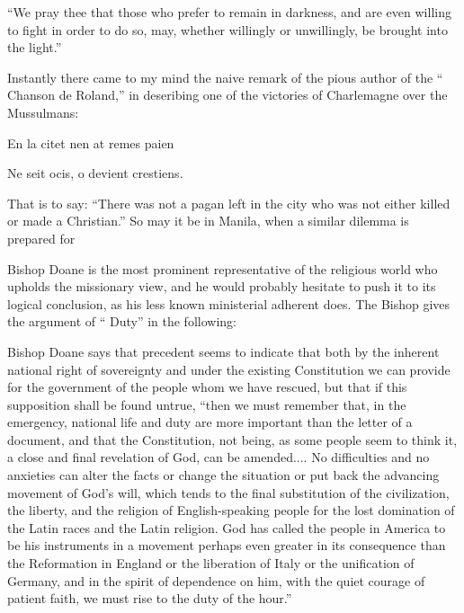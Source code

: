\documentclass[11pt,openany]{book}
\begin{document}
``We pray thee that those who prefer to remain in darkness, and are even willing to fight in order to do so, may, whether willingly or unwillingly, be brought into the light.''

Instantly there came to my mind the naive remark of the pious author of the `` Chanson de Roland,'' in deseribing one of the victories of Charlemagne over the Mussulmans:

En la citet nen at remes paien

Ne seit ocis, o devient crestiens.

That is to say: ``There was not a pagan left in the city who was not either killed or made a Christian.'' So may it be in Manila, when a similar dilemma is prepared for

Bishop Doane is the most prominent representative of the religious world who upholds the missionary view, and he would probably hesitate to push it to its logical conclusion, as his less known ministerial adherent does. The Bishop gives the argument of `` Duty'' in the following:

Bishop Doane says that precedent seems to indicate that both by the inherent national right of sovereignty and under the existing Constitution we can provide for the government of the people whom we have rescued, but that if this supposition shall be found untrue, ``then we must remember that, in the emergency, national life and duty are more important than the letter of a document, and that the Constitution, not being, as some people seem to think it, a close and final revelation of God, can be amended.... No difficulties and no anxieties can alter the facts or change the situation or put back the advancing movement of God's will, which tends to the final substitution of the civilization, the liberty, and the religion of English-speaking people for the lost domination of the Latin races and the Latin religion. God has called the people in America to be his instruments in a movement perhaps even greater in its consequence than the Reformation in England or the liberation of Italy or the unification of Germany, and in the spirit of dependence on him, with the quiet courage of patient faith, we must rise to the duty of the hour.''
\end{document}
